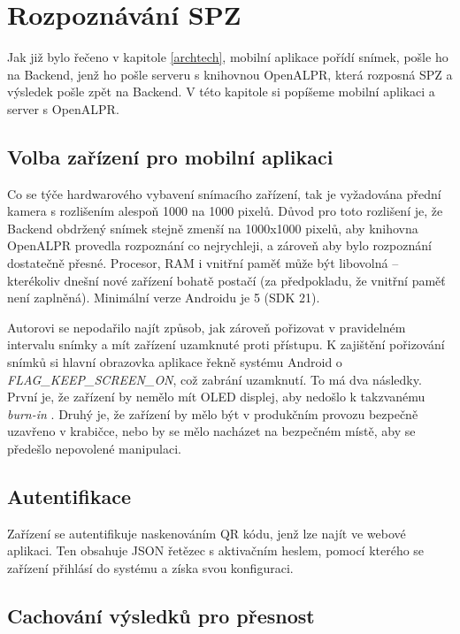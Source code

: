 
\chapter{Rozpoznávání SPZ}

Jak již bylo řečeno v kapitole \ref{archtech}, mobilní aplikace pořídí snímek,
pošle ho na Backend, jenž ho pošle serveru s knihovnou OpenALPR, která
rozposná SPZ a výsledek pošle zpět na Backend. V této kapitole si popíšeme
mobilní aplikaci a server s OpenALPR.

\section{Volba zařízení pro mobilní aplikaci}

Co se týče hardwarového vybavení snímacího zařízení, tak je vyžadována přední kamera
s rozlišením alespoň 1000 na 1000 pixelů. Důvod pro toto rozlišení je, že Backend obdržený snímek
stejně zmenší na 1000x1000 pixelů, aby knihovna OpenALPR provedla rozpoznání co nejrychleji, a zároveň
aby bylo rozpoznání dostatečně přesné. Procesor, RAM i vnitřní paměť může být libovolná -- kterékoliv
dnešní nové zařízení bohatě postačí (za předpokladu, že vnitřní paměť není zaplněná).
Minimální verze Androidu je 5 (SDK 21).

Autorovi se nepodařilo najít způsob, jak zároveň pořizovat v pravidelném intervalu snímky
a mít zařízení uzamknuté proti přístupu. K zajištění pořizování snímků si hlavní
obrazovka aplikace řekně systému Android o \textit{FLAG\_KEEP\_SCREEN\_ON}, což zabrání uzamknutí.
To má dva následky. První je, že zařízení by nemělo mít OLED displej, aby nedošlo k takzvanému
\textit{burn-in} \citep[viz][]{OledBurnIn}. Druhý je, že zařízení by mělo být v produkčním provozu
bezpečně uzavřeno v krabičce, nebo by se mělo nacházet na bezpečném místě, aby se předešlo
nepovolené manipulaci.

\section{Autentifikace}

Zařízení se autentifikuje naskenováním QR kódu, jenž lze najít ve webové aplikaci. Ten obsahuje
JSON řetězec s aktivačním heslem, pomocí kterého se zařízení přihlásí do systému a získa svou konfiguraci.

\section{Cachování výsledků pro přesnost}

